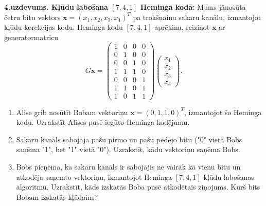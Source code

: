 \documentclass[a4paper,12pt]{article}
\begin{document}
\vspace{6pt}
{\bf 4.uzdevums. Kļūdu labošana $[7,4,1]$ Heminga kodā:} 
Mums jānosūta četru bitu vektors $\mathbf{x}=(x_1,x_2,x_3,x_4)^T$ 
pa trokšņainu sakaru kanālu, izmantojot kļūdu korekcijas kodu. 
Heminga kodu  $[7,4,1]$ aprēķina, reizinot $\mathbf{x}$ ar 
ģeneratormatricu
$$G\mathbf{x} = \left(
\begin{array}{cccc}
1 & 0 & 0 & 0 \\
0 & 1 & 0 & 0 \\
0 & 0 & 1 & 0 \\
1 & 1 & 1 & 0 \\
0 & 0 & 0 & 1 \\
1 & 1 & 0 & 1 \\
1 & 0 & 1 & 1 
\end{array} \right) \left( \begin{array}{c}
x_1\\
x_2\\
x_3\\
x_4
\end{array} \right).$$
\begin{enumerate}[label=(\alph*)]
\item Alise grib nosūtīt Bobam vektoriņu $\mathbf{x} = (0,1,1,0)^T$, izmantojot šo Heminga kodu.
Uzrakstīt Alises pusē iegūto Heminga kodējumu.
\item Sakaru kanāls sabojāja pašu pirmo un pašu pēdējo bitu ("0" vietā Bobs saņēma "1",
bet "1" vietā "0"). Uzrakstīt, kādu vektoriņu saņēma Bobs.
\item Bobs pieņēma, ka sakaru kanāls ir sabojājis ne vairāk kā vienu bitu un atkodēja
saņemto vektoriņu, izmantojot Heminga $[7,4,1]$ kļūdu labošanas algoritmu. 
Uzrakstīt, kāds izskatās Boba pusē atkodētais ziņojums.
Kurš bits Bobam izskatās kļūdains?
\end{enumerate}
\end{document}
